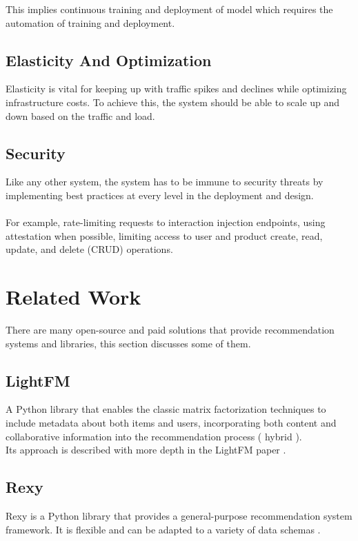 This implies continuous training and deployment of model which requires the automation of training and deployment.

\subsection{Elasticity And Optimization}

Elasticity is vital for keeping up with traffic spikes and declines while optimizing infrastructure costs. To achieve this, the system should be able to scale up and down based on the traffic and load.

\subsection{Security}

Like any other system, the system has to be immune to security threats by implementing best practices at every level in the deployment and design. \\ \\
For example, rate-limiting requests to interaction injection endpoints, using attestation when possible, limiting access to user and product create, read, update, and delete (CRUD) operations.
 
\section{Related Work}

There are many open-source and paid solutions that provide recommendation systems and libraries, this section discusses some of them.

\subsection{LightFM}
A Python library that enables the classic matrix factorization techniques to include metadata about both items and users, incorporating both content and collaborative information into the recommendation process ( hybrid )\cite{LightFM}.  \\

Its approach is described with more depth in the LightFM paper \cite{kula2015metadata}.

\subsection{Rexy}
Rexy\cite{Rexy} is a Python library that provides a general-purpose recommendation system framework. It is flexible and can be adapted to a variety of data schemas \cite{Rexy}.

